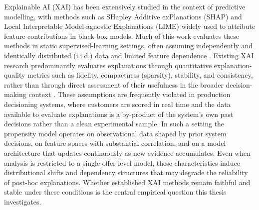 \documentclass[oneside]{memoir} %
\begin{document}
Explainable AI (XAI) has been extensively studied in the context of predictive modelling, with methods such as SHapley Additive exPlanations (SHAP) \parencite{lundberg_unified_2017} and Local Interpretable Model-agnostic Explanations (LIME) \parencite{ribeiro_why_2016} widely used to attribute feature contributions in black-box models. Much of this work evaluates these methods in static supervised-learning settings, often assuming independently and identically distributed (i.i.d.) data and limited feature dependence \parencite{vilone_explainable_2020, molnar_interpretable_2025}. Existing XAI research predominantly evaluates explanations through quantitative explanation-quality metrics such as fidelity, compactness (sparsity), stability, and consistency, rather than through direct assessment of their usefulness in the broader decision-making context \parencite{nauta_anecdotal_2023}. These assumptions are frequently violated in production decisioning systems, where customers are scored in real time and the data available to evaluate explanations is a by-product of the system's own past decisions rather than a clean experimental sample. In such a setting the propensity model operates on observational data shaped by prior system decisions, on feature spaces with substantial correlation, and on a model architecture that updates continuously as new evidence accumulates. Even when analysis is restricted to a single offer-level model, these characteristics induce distributional shifts and dependency structures that may degrade the reliability of post-hoc explanations. Whether established XAI methods remain faithful and stable under these conditions is the central empirical question this thesis investigates.
\end{document}
